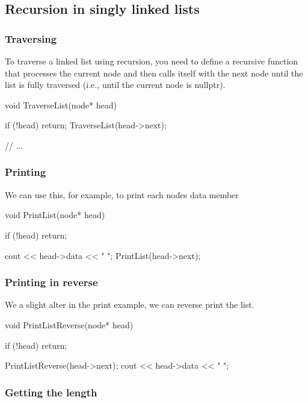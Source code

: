 \documentclass{report}
\begin{document}
\subsection{Recursion in singly linked lists}
\bigbreak \noindent 
\subsubsection{Traversing}
\bigbreak \noindent 
To traverse a linked list using recursion, you need to define a recursive function that processes the current node and then calls itself with the next node until the list is fully traversed (i.e., until the current node is nullptr).
\bigbreak \noindent 
\begin{cppcode}
    void TraverseList(node* head) {
        if (!head) {
            return;
        }
        TraverseList(head->next);

        // ...
    }
\end{cppcode}
\bigbreak \noindent 
\subsubsection{Printing}
\bigbreak \noindent \bigbreak \noindent 
We can use this, for example, to print each nodes data member
\bigbreak \noindent 
\begin{cppcode}
    void PrintList(node* head) {
        if (!head) return;

        cout << head->data << " ";
        PrintList(head->next);
    }
\end{cppcode}

\bigbreak \noindent 
\subsubsection{Printing in reverse}
\bigbreak \noindent \bigbreak \noindent 
We a slight alter in the print example, we can reverse print the list. 
\bigbreak \noindent 
\begin{cppcode}
    void PrintListReverse(node* head) {
        if (!head) return;

        PrintListReverse(head->next);
        cout << head->data << " ";
    }
\end{cppcode}

\bigbreak \noindent 
\subsubsection{Getting the length}
\bigbreak \noindent 
\end{document}
